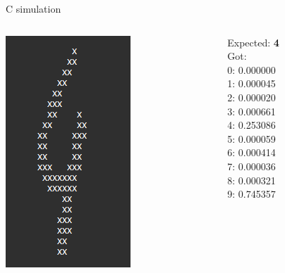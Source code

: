 \documentclass[10pt, xcolor=dvipsnames, compress]{beamer}
\begin{document}
\begin{frame}{C simulation}
\begin{spacing}{0.9}
\begin{columns}[T]
        \begin{column}{.15\textwidth}
            \includegraphics[width=.85\textwidth]{4-bad-class.png}
        \end{column}
        \begin{column}{.15\textwidth}
            \scriptsize
            Expected: \textbf{4}\\[2ex]
            Got:\\
            0: 0.000000\\
            1: 0.000045\\
            2: 0.000020\\
            3: 0.000661\\
            4: 0.253086\\
            5: 0.000059\\
            6: 0.000414\\
            7: 0.000036\\
            8: 0.000321\\
            9: 0.745357
        \end{column}


\end{columns}
\end{spacing}
\end{frame}
\end{document}
